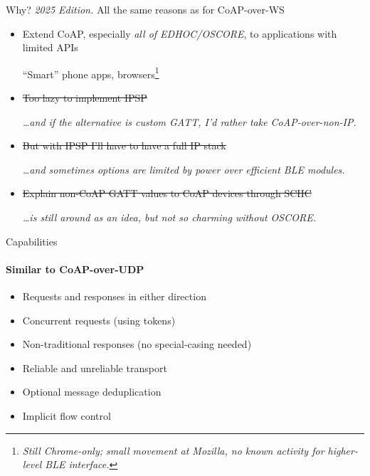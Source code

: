 \begin{frame}{Why? \textit{2025 Edition.}}
  \large
  All the same reasons as for CoAP-over-WS

  \bigskip

  \begin{itemize}
    \item Extend CoAP, especially \textit{all of EDHOC/OSCORE}, to applications with limited APIs

      \bigskip

      “Smart” phone apps, browsers\footnote{\textit{Still Chrome-only; small movement at Mozilla, no known activity for higher-level BLE interface.}}

      \bigskip

    \item \sout{Too lazy to implement IPSP}

      \textit{\ldots and if the alternative is custom GATT, I'd rather take CoAP-over-non-IP.}

    \bigskip

    \item \sout{But with IPSP I'll have to have a full IP stack}

      \textit{\ldots and sometimes options are limited by power over efficient BLE modules.}

    \bigskip

  \item \sout{Explain non-CoAP GATT values to CoAP devices through SCHC}

    \textit{\ldots is still around as an idea, but not so charming without OSCORE.}

  \end{itemize}
\end{frame}

\begin{frame}{Capabilities}\Large
  \framesubtitle{Similar to CoAP-over-UDP}
  \begin{itemize}
    \item Requests and responses in either direction
    \item Concurrent requests (using tokens)
    \item Non-traditional responses (no special-casing needed)
    \item Reliable and unreliable transport
    \item Optional message deduplication
    \item Implicit flow control
  \end{itemize}
\end{frame}


